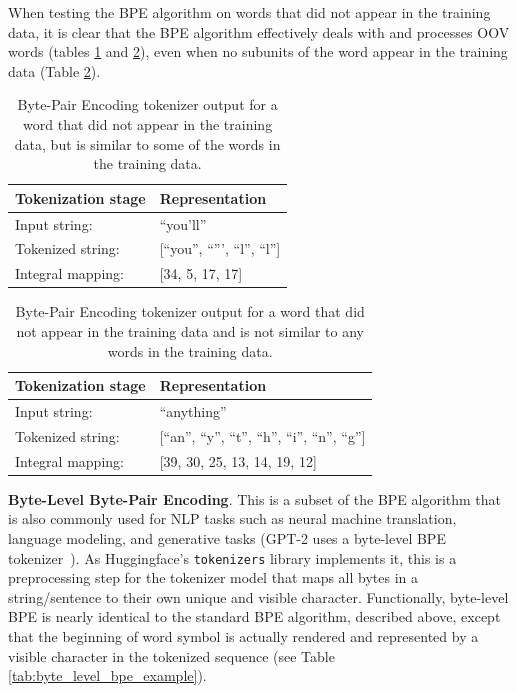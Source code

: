\documentclass[12pt]{article}
\begin{document}
When testing the BPE algorithm on words that did not appear in the training data, it is clear that the BPE algorithm effectively deals with and
processes OOV words (tables \ref{tab:bpe_unk_similar} and \ref{tab:bpe_unk}), even when no subunits of the word appear in the training data (Table
\ref{tab:bpe_unk}).

\begin{table}[!t]
    \centering
    \begin{tabular}{l l}
        \toprule
        Tokenization stage & Representation                 \\
        \midrule
        Input string:      & ``you'll''                     \\
        Tokenized string:  & [``you'', ``''', ``l'', ``l''] \\
        Integral mapping:  & [34, 5, 17, 17]                \\
        \bottomrule
    \end{tabular}
    \caption{Byte-Pair Encoding tokenizer output for a word that did not appear in the training data, but is similar to some of the words in the
        training data.}
    \label{tab:bpe_unk_similar}
\end{table}

\begin{table}[!t]
    \centering
    \begin{tabular}{l l}
        \toprule
        Tokenization stage & Representation                                     \\
        \midrule
        Input string:      & ``anything''                                       \\
        Tokenized string:  & [``an'', ``y'', ``t'', ``h'', ``i'', ``n'', ``g''] \\
        Integral mapping:  & [39, 30, 25, 13, 14, 19, 12]                       \\
        \bottomrule
    \end{tabular}
    \caption{Byte-Pair Encoding tokenizer output for a word that did not appear in the training data and is not similar to any words in the training
        data.}
    \label{tab:bpe_unk}
\end{table}

\textbf{Byte-Level Byte-Pair Encoding}. This is a subset of the BPE algorithm that is also commonly used for NLP tasks such as neural machine
translation, language modeling, and generative tasks (GPT-2 uses a byte-level BPE tokenizer~\cite{radford_language_2019}). As Huggingface's
\lstinline|tokenizers| library implements it, this is a preprocessing step for the tokenizer model that maps all bytes in a string/sentence to their
own unique and visible character. Functionally, byte-level BPE is nearly identical to the standard BPE algorithm, described above, except that the
beginning of word symbol is actually rendered and represented by a visible character in the tokenized sequence (see Table
\ref{tab:byte_level_bpe_example}).
\end{document}
